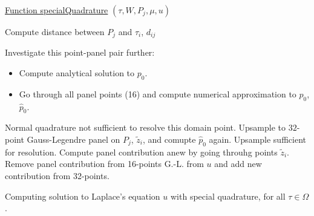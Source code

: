 \documentclass[a4paper,10pt]{article}
\begin{document}
\begin{algorithm}[ht]

    \underline{Function specialQuadrature} $(\tau,W, P_j, \mu, u)$\;
     {
         {
            Compute distance between $P_j$ and $\tau_i$, $d_{ij}$
             {
                Investigate this point-panel pair further: \\
                \begin{itemize}
                    \item Compute analytical solution to $p_0$.
                    \item Go through all panel points (16) and compute numerical approximation to $p_0$, $\hat{p}_0$.
                \end{itemize}
                 {
                    Normal quadrature not sufficient to resolve this domain point.
                    Upsample to $32$-point Gauss-Legendre panel on $P_j$, $\tilde{z}_i$, and comupte $\hat{p}_0$ again. 
                     {
                        Upsample sufficient for resolution. Compute panel contribution anew by going throuhg points $\tilde{z}_i$. Remove panel contribution from 16-points G.-L. from $u$ and add new contribution from 32-points.
                    }
                }
            }
        }

    }
    \caption{Computing solution to Laplace's equation $u$ with special quadrature, for all $\tau\in\Omega$.}
    \label{alg:specQ}
\end{algorithm}
\end{document}
